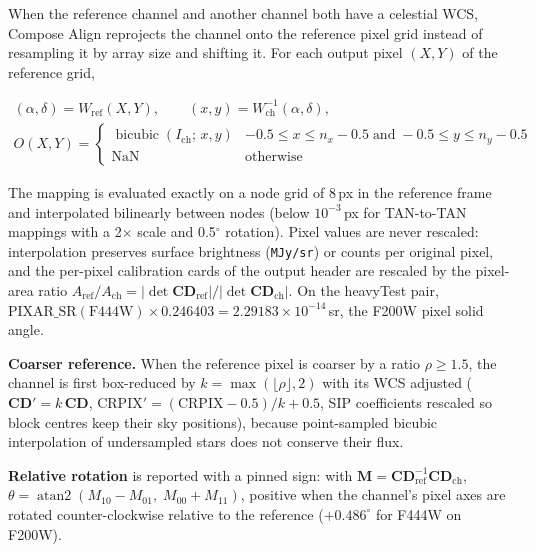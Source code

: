 \documentclass[11pt,a4paper]{article}
\newcommand{\code}[1]{\texttt{\small #1}}
\newcommand{\mat}[1]{\mathbf{#1}}
\begin{document}
    When the reference channel and another channel both have a celestial WCS, Compose Align reprojects the channel onto the reference pixel grid instead of resampling it by array size and shifting it. For each output pixel $(X, Y)$ of the reference grid,

    \begin{equation}
        \begin{gathered}
        (\alpha, \delta) = W_{\text{ref}}(X, Y), \qquad
        (x, y) = W_{\text{ch}}^{-1}(\alpha, \delta), \\[4pt]
        O(X, Y) = \begin{cases}
            \operatorname{bicubic}(I_{\text{ch}};\, x, y) & -0.5 \le x \le n_x - 0.5 \;\text{and}\; -0.5 \le y \le n_y - 0.5 \\
            \text{NaN} & \text{otherwise}
        \end{cases}
        \end{gathered}
    \end{equation}

    The mapping is evaluated exactly on a node grid of 8\,px in the reference frame and interpolated bilinearly between nodes (below $10^{-3}$\,px for TAN-to-TAN mappings with a 2$\times$ scale and 0.5$^{\circ}$ rotation). Pixel values are never rescaled: interpolation preserves surface brightness (\code{MJy/sr}) or counts per original pixel, and the per-pixel calibration cards of the output header are rescaled by the pixel-area ratio $A_{\text{ref}}/A_{\text{ch}} = |\det \mat{CD}_{\text{ref}}| / |\det \mat{CD}_{\text{ch}}|$. On the heavyTest pair, $\text{PIXAR\_SR}(\text{F444W}) \times 0.246403 = 2.29183 \times 10^{-14}$\,sr, the F200W pixel solid angle.

    \textbf{Coarser reference.} When the reference pixel is coarser by a ratio $\rho \ge 1.5$, the channel is first box-reduced by $k = \max(\lfloor \rho \rfloor, 2)$ with its WCS adjusted ($\mat{CD}' = k\,\mat{CD}$, $\text{CRPIX}' = (\text{CRPIX} - 0.5)/k + 0.5$, SIP coefficients rescaled so block centres keep their sky positions), because point-sampled bicubic interpolation of undersampled stars does not conserve their flux.

    \textbf{Relative rotation} is reported with a pinned sign: with $\mat{M} = \mat{CD}_{\text{ref}}^{-1} \mat{CD}_{\text{ch}}$, $\theta = \operatorname{atan2}(M_{10} - M_{01},\; M_{00} + M_{11})$, positive when the channel's pixel axes are rotated counter-clockwise relative to the reference ($+0.486^{\circ}$ for F444W on F200W).
\end{document}
